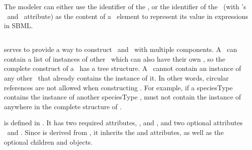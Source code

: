 The modeler can either use the identifier of the \parameter, or the identifier of the \possibleSpeciesFeatureValue\ (with 's \representationTypeAtt\ and \speciesReferenceAtt\ attribute) as the content of a \ci\ element to represent its value in  expressions in SBML.

\clearpage

\subsection{} 
\label{def:SpeciesTypeInstance}

 serves to provide a way to construct \speciesTypes\ and \species\ with multiple components. A \speciesType\ can contain a list of instances of other \speciesTypes\ which can also have their own \speciesTypeInstances, so the complete construct of a \speciesType\ has a tree structure. A \speciesType\ cannot contain an instance of any other \speciesType\ that already contains the instance of it. In other words,  circular references are not allowed when constructing \speciesTypes. For example, if a speciesType  contains the instance of another speciesType ,  must not contain the instance of  anywhere in the complete structure of .

 is defined in . It has two required attributes, \idAtt, and \speciesTypeAtt, and two optional attributes \nameAtt\ and \compartmentReferenceAtt. Since  is derived from , it inherits the  and  attributes, as well as the optional children  and  objects.

